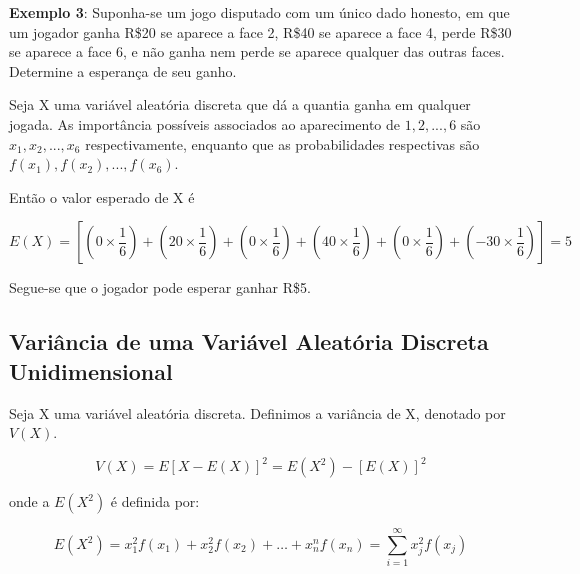 \documentclass[a4paper,12pt]{report}
\begin{document}
{\textbf{Exemplo 3}: Suponha-se um jogo disputado com um único dado
honesto, em que um jogador ganha R\$20 se aparece a face 2, R\$40
se aparece a face 4, perde R\$30 se aparece a face 6, e não ganha
nem perde se aparece qualquer das outras faces. Determine a
esperança de seu ganho.\vskip0.3cm

Seja X uma variável aleatória discreta que dá a quantia ganha em
qualquer jogada. As importância possíveis associados ao
aparecimento de $1,2,...,6$ são $x_{1},x_{2},...,x_{6}$
respectivamente, enquanto que as probabilidades respectivas são
$f(x_{1}),f(x_{2}),...,f(x_{6})$.


\begin{table}[!htb]
\end{table}

Então o valor esperado de X é

$$
E(X)= \left[\left(0 \times \frac{1}{6}\right)+\left(20 \times
\frac{1}{6}\right)+ \left(0 \times \frac{1}{6}\right)+ \left(40
\times \frac{1}{6}\right)+\left(0 \times
\frac{1}{6}\right)+\left(-30 \times \frac{1}{6}\right)\right]=5
$$

Segue-se que o jogador pode esperar ganhar R\$5.


\subsection{Variância de uma Variável Aleatória Discreta Unidimensional}

Seja X uma variável aleatória discreta. Definimos a variância de
X, denotado por $V(X)$.

\begin{equation}\label{v(x)}
    V(X) = E[X-E(X)]^{2} = E(X^{2})-[E(X)]^{2}
\end{equation}

onde a $E(X^{2})$ é definida por:

\begin{equation}\label{e(x)}
    E(X^{2}) = x_{1}^{2}f(x_{1})+x_{2}^{2}f(x_{2})+\ldots+x_{n}^{n}f(x_{n})= \sum_{i=1}^{\infty} x_{j}^{2}f(x_{j})
\end{equation}


}
\end{document}
